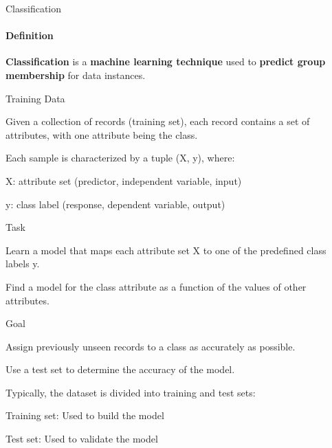 \documentclass[aspectratio=169]{beamer}
\begin{document}
\begin{frame}{Classification}
    \framesubtitle{Definition}
    \begin{tugitemize}
        \item \small\textbf{Classification} is a \textbf{machine learning technique} used to \textbf{predict group membership} for data instances.
        \item \small Training Data
        \begin{tugitemize}
            \item \scriptsize Given a collection of records (training set), each record contains a set of attributes, with one attribute being the class.
            \item \scriptsize Each sample is characterized by a tuple (X, y), where:
            \item \scriptsize X: attribute set (predictor, independent variable, input)
            \item \scriptsize y: class label (response, dependent variable, output)
        \end{tugitemize}
        \item \small Task
        \begin{tugitemize}
            \item \scriptsize Learn a model that maps each attribute set X to one of the predefined class labels y.
            \item \scriptsize Find a model for the class attribute as a function of the values of other attributes.
        \end{tugitemize}
        \item \small Goal
        \begin{tugitemize}
            \item \scriptsize Assign previously unseen records to a class as accurately as possible.
            \item \scriptsize Use a test set to determine the accuracy of the model.
            \item \scriptsize Typically, the dataset is divided into training and test sets:
            \item \scriptsize Training set: Used to build the model
            \item \scriptsize Test set: Used to validate the model
        \end{tugitemize}
    \end{tugitemize}
\end{frame}
\end{document}
